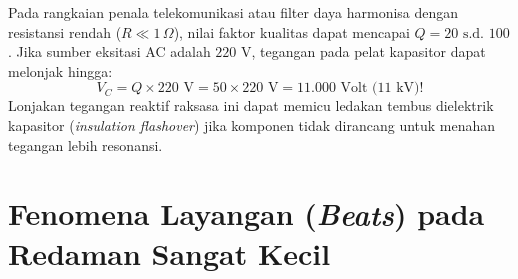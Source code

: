 \documentclass[11pt,a4paper]{article}
\theoremstyle{definition}
\begin{document}
\begin{tcolorbox}[colback=red!5!white,colframe=red!80!black,title=\textbf{Peringatan Rekayasa Industri: Bahaya Resonansi Tegangan}]
Pada rangkaian penala telekomunikasi atau filter daya harmonisa dengan resistansi rendah ($R \ll 1\,\Omega$), nilai faktor kualitas dapat mencapai $Q = 20\text{ s.d. } 100$. Jika sumber eksitasi AC adalah $220\text{ V}$, tegangan pada pelat kapasitor dapat melonjak hingga:
\begin{equation*}
    V_C = Q \times 220\text{ V} = 50 \times 220\text{ V} = 11.000\text{ Volt (}11\text{ kV)!}
\end{equation*}
Lonjakan tegangan reaktif raksasa ini dapat memicu ledakan tembus dielektrik kapasitor (\textit{insulation flashover}) jika komponen tidak dirancang untuk menahan tegangan lebih resonansi.
\end{tcolorbox}

\section{Fenomena Layangan (\textit{Beats}) pada Redaman Sangat Kecil}
\end{document}
